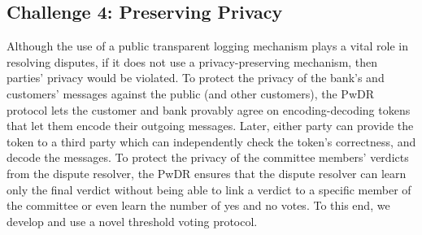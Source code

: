 \subsection{Challenge 4: Preserving Privacy}
 Although the use of a public transparent logging mechanism plays a vital role in resolving disputes, if it does not use a  privacy-preserving mechanism, then  parties' privacy would be violated. To protect the  privacy of the bank's and customers' messages against the public (and other customers), the PwDR protocol lets the customer and bank provably agree on encoding-decoding tokens that let them  encode their outgoing messages. Later, either party can provide the token to a third party which can independently check the token's correctness, and decode the messages. To protect the privacy of the committee members' verdicts from the  dispute resolver, the PwDR   ensures that  the dispute resolver can learn only the final verdict without being able to link a verdict to a specific  member of the committee or even learn the number of yes and no votes. To this end, we develop and use a novel threshold voting protocol. 
 
 
 
 